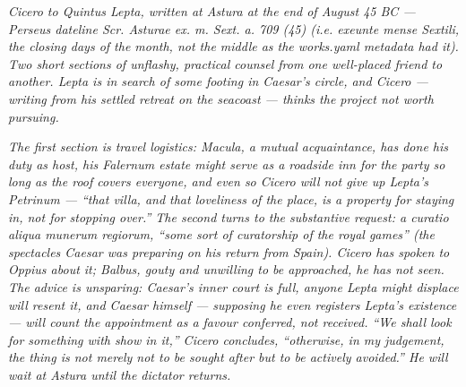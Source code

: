 
\textit{Cicero to Quintus Lepta, written at Astura at the end of
August 45 BC --- Perseus dateline \textit{Scr. Asturae ex. m.
Sext. a. 709 (45)} (i.e. \textit{exeunte mense Sextili}, the
closing days of the month, not the middle as the works.yaml
metadata had it). Two short sections of unflashy, practical
counsel from one well-placed friend to another. Lepta is in
search of some footing in Caesar's circle, and Cicero --- writing
from his settled retreat on the seacoast --- thinks the project
not worth pursuing.}

\textit{The first section is travel logistics: Macula, a mutual
acquaintance, has done his duty as host, his Falernum estate
might serve as a roadside inn for the party so long as the roof
covers everyone, and even so Cicero will not give up Lepta's
Petrinum --- ``that villa, and that loveliness of the place, is a
property for staying in, not for stopping over.'' The second
turns to the substantive request: a \textit{curatio aliqua munerum
regiorum}, ``some sort of curatorship of the royal games'' (the
spectacles Caesar was preparing on his return from Spain). Cicero
has spoken to Oppius about it; Balbus, gouty and unwilling to be
approached, he has not seen. The advice is unsparing: Caesar's
inner court is full, anyone Lepta might displace will resent it,
and Caesar himself --- supposing he even registers Lepta's
existence --- will count the appointment as a favour conferred,
not received. ``We shall look for something with show in it,''
Cicero concludes, ``otherwise, in my judgement, the thing is not
merely not to be sought after but to be actively avoided.'' He
will wait at Astura until the dictator returns.}
